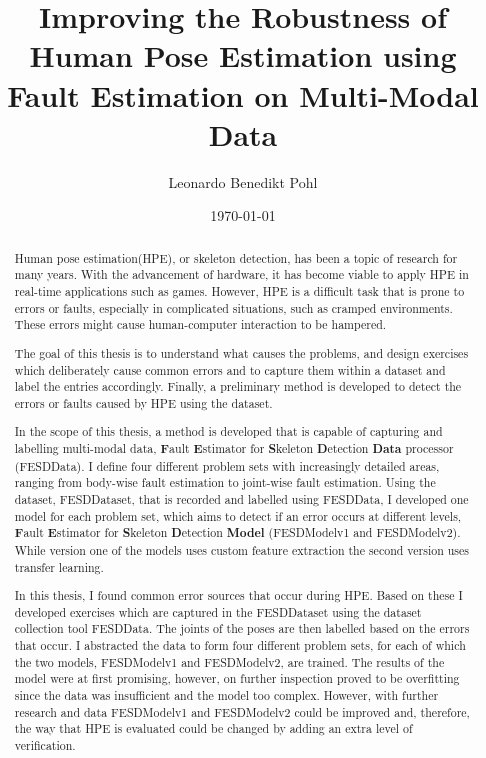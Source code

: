 
\title{Improving the Robustness of Human Pose Estimation using Fault Estimation on Multi-Modal Data}
\author{Leonardo Benedikt Pohl}
\date{\today}
 
\newlength{\originalVOffset}
\newlength{\originalHOffset}
\setlength{\originalVOffset}{\voffset}   
\setlength{\originalHOffset}{\hoffset}

\setlength{\voffset}{0cm}
\setlength{\hoffset}{0cm}

\setlength{\voffset}{\originalVOffset}
\setlength{\hoffset}{\originalHOffset}

\clearpage

\begin{abstract}  
  Human pose estimation(HPE), or skeleton detection, has been a topic of research for many years. With the advancement of hardware, it has become viable to apply HPE in real-time applications such as games. However, HPE is a difficult task that is prone to errors or faults, especially in complicated situations, such as cramped environments. These errors might cause human-computer interaction to be hampered.

  The goal of this thesis is to understand what causes the problems, and design exercises which deliberately cause common errors and to capture them within a dataset and label the entries accordingly. Finally, a preliminary method is developed to detect the errors or faults caused by HPE using the dataset.

  In the scope of this thesis, a method is developed that is capable of capturing and labelling multi-modal data, \textbf{F}ault \textbf{E}stimator for \textbf{S}keleton \textbf{D}etection \textbf{Data} processor (FESDData). I define four different problem sets with increasingly detailed areas, ranging from body-wise fault estimation to joint-wise fault estimation. Using the dataset, FESDDataset, that is recorded and labelled using FESDData, I developed one model for each problem set, which aims to detect if an error occurs at different levels, \textbf{F}ault \textbf{E}stimator for \textbf{S}keleton \textbf{D}etection \textbf{Model} (FESDModelv1 and FESDModelv2). While version one of the models uses custom feature extraction the second version uses transfer learning.

  In this thesis, I found common error sources that occur during HPE. Based on these I developed exercises which are captured in the FESDDataset using the dataset collection tool FESDData. The joints of the poses are then labelled based on the errors that occur. I abstracted the data to form four different problem sets, for each of which the two models, FESDModelv1 and FESDModelv2, are trained. The results of the model were at first promising, however, on further inspection proved to be overfitting since the data was insufficient and the model too complex. However, with further research and data FESDModelv1 and FESDModelv2 could be improved and, therefore, the way that HPE is evaluated could be changed by adding an extra level of verification.

\end{abstract}
